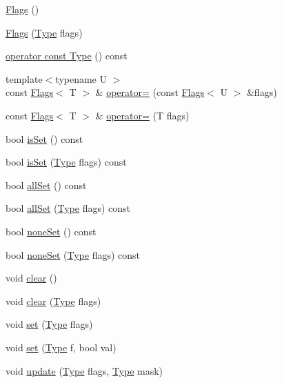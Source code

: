 \begin{DoxyCompactItemize}
\item 
\hyperlink{classFlags_a9d4763cab85470385da6310f3343fd88}{Flags} ()
\item 
\hyperlink{classFlags_a2c2c0ec31d357ed56d83db246e10fefc}{Flags} (\hyperlink{classFlags_a685b7a70f0ae1f2881cf8937d951c3b1}{Type} flags)
\item 
\hyperlink{classFlags_a14bc478d07abb05059cab5049412ea5e}{operator const Type} () const 
\item 
{\footnotesize template$<$typename U $>$ }\\const \hyperlink{classFlags}{Flags}$<$ T $>$ \& \hyperlink{classFlags_a7b7a5f51d8423793f918f5a9471e4528}{operator=} (const \hyperlink{classFlags}{Flags}$<$ U $>$ \&flags)
\item 
const \hyperlink{classFlags}{Flags}$<$ T $>$ \& \hyperlink{classFlags_a0367a36b9df81fe58a45bc9dc0f9f86e}{operator=} (T flags)
\item 
bool \hyperlink{classFlags_ac976964169b81aaba1d4cbb422f559ca}{isSet} () const 
\item 
bool \hyperlink{classFlags_aaf4d0865ccb7b4e5278a619ee93e1241}{isSet} (\hyperlink{classFlags_a685b7a70f0ae1f2881cf8937d951c3b1}{Type} flags) const 
\item 
bool \hyperlink{classFlags_a3f561039db06de9adcd4b1f9babc0a61}{allSet} () const 
\item 
bool \hyperlink{classFlags_a69355f25ed4580ab775344e0e3cb67cd}{allSet} (\hyperlink{classFlags_a685b7a70f0ae1f2881cf8937d951c3b1}{Type} flags) const 
\item 
bool \hyperlink{classFlags_af3d473e1675288811ae75089c45bdced}{noneSet} () const 
\item 
bool \hyperlink{classFlags_a593c66ded65e09a0bae20c243eb45066}{noneSet} (\hyperlink{classFlags_a685b7a70f0ae1f2881cf8937d951c3b1}{Type} flags) const 
\item 
void \hyperlink{classFlags_ac8bb3912a3ce86b15842e79d0b421204}{clear} ()
\item 
void \hyperlink{classFlags_a3c01e317c823d764c5ad343ae7028185}{clear} (\hyperlink{classFlags_a685b7a70f0ae1f2881cf8937d951c3b1}{Type} flags)
\item 
void \hyperlink{classFlags_a8bf75cf89ee252c33f05dd2e8e06d351}{set} (\hyperlink{classFlags_a685b7a70f0ae1f2881cf8937d951c3b1}{Type} flags)
\item 
void \hyperlink{classFlags_aa0d392c090761994a8f5221fa2871d26}{set} (\hyperlink{classFlags_a685b7a70f0ae1f2881cf8937d951c3b1}{Type} f, bool val)
\item 
void \hyperlink{classFlags_a6d2c1e5d026979d5dc449f445ec0dc98}{update} (\hyperlink{classFlags_a685b7a70f0ae1f2881cf8937d951c3b1}{Type} flags, \hyperlink{classFlags_a685b7a70f0ae1f2881cf8937d951c3b1}{Type} mask)
\end{DoxyCompactItemize}
